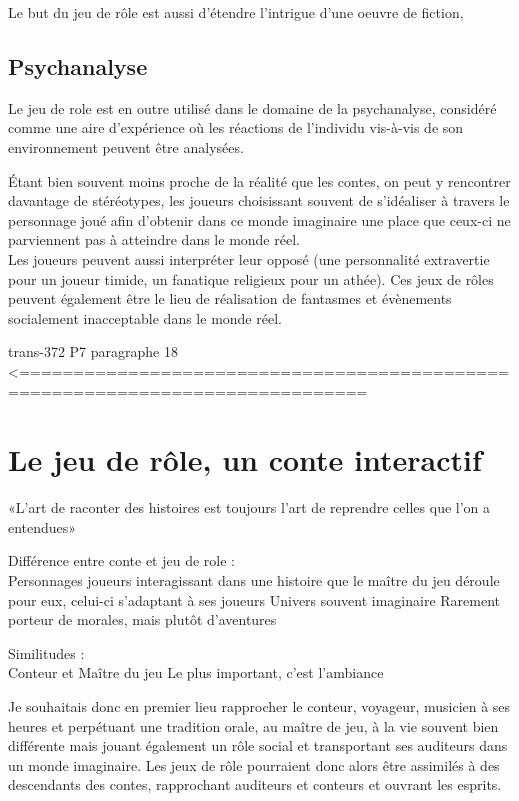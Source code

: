 \documentclass[a4paper,12pt,final,oneside]{article}
\begin{document}
Le but du jeu de rôle est aussi d'étendre l'intrigue d'une oeuvre de fiction, 

\subsection{Psychanalyse}
Le jeu de role est en outre utilisé dans le domaine de la psychanalyse, considéré comme une aire d'expérience où les réactions de l'individu vis-à-vis de son environnement peuvent être analysées.

Étant bien souvent moins proche de la réalité que les contes, on peut y rencontrer davantage de stéréotypes, les joueurs choisissant souvent de s'idéaliser à travers le personnage joué afin d'obtenir dans ce monde imaginaire une place que ceux-ci ne parviennent pas à atteindre dans le monde réel.\\
Les joueurs peuvent aussi interpréter leur opposé (une personnalité extravertie pour un joueur timide, un fanatique religieux pour un athée). Ces jeux de rôles peuvent également être le lieu de réalisation de fantasmes et évènements socialement inacceptable dans le monde réel.


trans-372 P7 paragraphe 18 <==============================================================================




\section{Le jeu de rôle, un conte interactif}
«L'art de raconter des histoires est toujours l'art de reprendre celles que l'on a entendues»

Différence entre conte et jeu de role : \\
Personnages joueurs interagissant dans une histoire que le maître du jeu déroule pour eux, celui-ci s'adaptant à ses joueurs
Univers souvent imaginaire
Rarement porteur de morales, mais plutôt d'aventures


Similitudes :\\
Conteur et Maître du jeu
Le plus important, c'est l'ambiance


Je souhaitais donc en premier lieu rapprocher le conteur, voyageur, musicien à ses heures et perpétuant une tradition orale, au maître de jeu, à la vie souvent bien différente mais jouant également un rôle social et transportant ses auditeurs dans un monde imaginaire.
Les jeux de rôle pourraient donc alors être assimilés à des descendants des contes, rapprochant auditeurs et conteurs et ouvrant les esprits.\\
\end{document}
